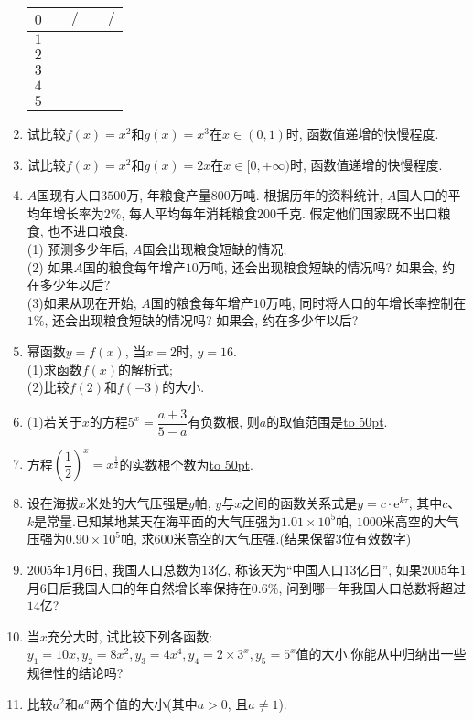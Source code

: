 \documentclass[10pt,a4paper]{article}
\newcommand{\blank}[1]{\underline{\hbox to #1pt{}}}
\begin{document}
\begin{enumerate}[1.]
\begin{center}
\begin{tabular}{|p{}<{\centering}|p{}<{\centering}|p{}<{\centering}|p{}<{\centering}|p{}<{\centering}|}
        $0$ & & $\slash$ & & $\slash$ \\ \hline
        $1$ & & & & \\ \hline
        $2$ & & & & \\ \hline
        $3$ & & & & \\ \hline
        $4$ & & & & \\ \hline
        $5$ & & & & \\ \hline
    \end{tabular}
\end{center}
\item 试比较$f(x)=x^2$和$g(x)=x^3$在$x\in (0,1)$时, 函数值递增的快慢程度.
\item 试比较$f(x)=x^2$和$g(x)=2x$在$x\in [0, +\infty)$时, 函数值递增的快慢程度.
\item $A$国现有人口$3500$万, 年粮食产量$800$万吨. 根据历年的资料统计, $A$国人口的平均年增长率为$2\%$, 每人平均每年消耗粮食$200$千克. 假定他们国家既不出口粮食, 也不进口粮食.\\
(1) 预测多少年后, $A$国会出现粮食短缺的情况;\\
(2) 如果$A$国的粮食每年增产$10$万吨, 还会出现粮食短缺的情况吗? 如果会, 约在多少年以后?\\
(3)如果从现在开始, $A$国的粮食每年增产$10$万吨, 同时将人口的年增长率控制在$1\%$, 还会出现粮食短缺的情况吗? 如果会, 约在多少年以后?
\item 幂函数$y=f(x)$, 当$x=2$时, $y=16$.\\
(1)求函数$f(x)$的解析式;\\
(2)比较$f(2)$和$f(-3)$的大小.
\item (1)若关于$x$的方程$5^x=\dfrac{a+3}{5-a}$有负数根, 则$a$的取值范围是\blank{50}.
\item 方程$(\dfrac 12)^x=x^{\frac 12}$的实数根个数为\blank{50}.
\item 设在海拔$x$米处的大气压强是$y$帕, $y$与$x$之间的函数关系式是$y=c\cdot \mathrm{e}^{k\tau}$, 其中$c$、$k$是常量.已知某地某天在海平面的大气压强为$1.01\times 10^5$帕, $1000$米高空的大气压强为$0.90\times 10^5$帕, 求$600$米高空的大气压强.(结果保留$3$位有效数字)
\item $2005$年$1$月$6$日, 我国人口总数为$13$亿, 称该天为``中国人口$13$亿日'', 如果$2005$年$1$月$6$日后我国人口的年自然增长率保持在$0.6\%$, 问到哪一年我国人口总数将超过$14$亿?
\item 当$x$充分大时, 试比较下列各函数: $y_1=10x,y_2=8x^2,y_3=4x^4,y_4=2\times 3^x,y_5=5^x$值的大小.你能从中归纳出一些规律性的结论吗?
\item 比较$a^2$和$a^a$两个值的大小(其中$a>0$, 且$a\ne 1$).

\end{enumerate}
\end{document}
